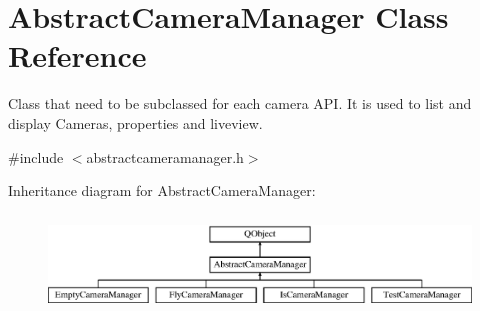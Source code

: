 \hypertarget{class_abstract_camera_manager}{\section{Abstract\-Camera\-Manager Class Reference}
\label{class_abstract_camera_manager}
}


Class that need to be subclassed for each camera A\-P\-I. It is used to list and display Cameras, properties and liveview.  




{\ttfamily \#include $<$abstractcameramanager.\-h$>$}

Inheritance diagram for Abstract\-Camera\-Manager\-:\begin{figure}[H]
\begin{center}
\leavevmode
\includegraphics[height=2.592592cm]{class_abstract_camera_manager}
\end{center}
\end{figure}
